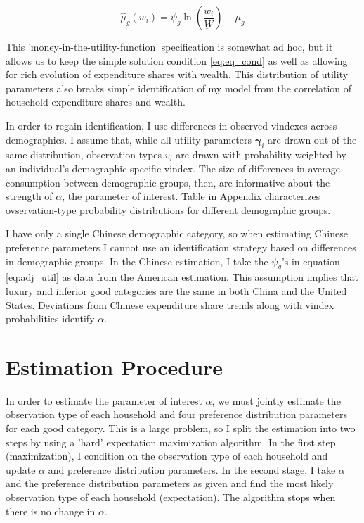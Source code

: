 \begin{equation}
    \label{eq:adj_util}
    \hat{\mu}_g(w_i) = \psi_g \ln \left(\frac{w_i}{\underbar{W}}\right) - \mu_g
\end{equation}

This 'money-in-the-utility-function' specification is somewhat ad hoc, but it allows us to keep the simple solution condition \eqref{eq:eq_cond} as well as allowing for rich evolution of expenditure shares with wealth.  This distribution of utility parameters also breaks simple identification of my model from the correlation of household expenditure shares and wealth.

In order to regain identification, I use differences in observed vindexes across demographics.  I assume that, while all utility parameters $\mathbf{\gamma}_i$ are drawn out of the same distribution, observation types $v_i$ are drawn with probability weighted by an individual's demographic specific vindex.  The size of differences in average consumption between demographic groups, then, are informative about the strength of $\alpha$, the parameter of interest.  Table  in Appendix characterizes ovservation-type probability distributions for different demographic groups.

I have only a single Chinese demographic category, so when estimating Chinese preference parameters I cannot use an identification strategy based on differences in demographic groups.  In the Chinese estimation, I take the $\psi_g$'s in equation \eqref{eq:adj_util} as data from the American estimation.  This assumption implies that luxury and inferior good categories are the same in both China and the United States.  Deviations from Chinese expenditure share trends along with vindex probabilities identify $\alpha$.

\section{Estimation Procedure} 

In order to estimate the parameter of interest $\alpha$, we must jointly estimate the observation type of each household and four preference distribution parameters for each good category.  This is a large problem, so I split the estimation into two steps by using a 'hard' expectation maximization algorithm.  In the first step (maximization), I condition on the observation type of each household and update $\alpha$ and preference distribution parameters.  In the second stage, I take $\alpha$ and the preference distribution parameters as given and find the most likely observation type of each household (expectation).  The algorithm stops when there is no change in $\alpha$.

